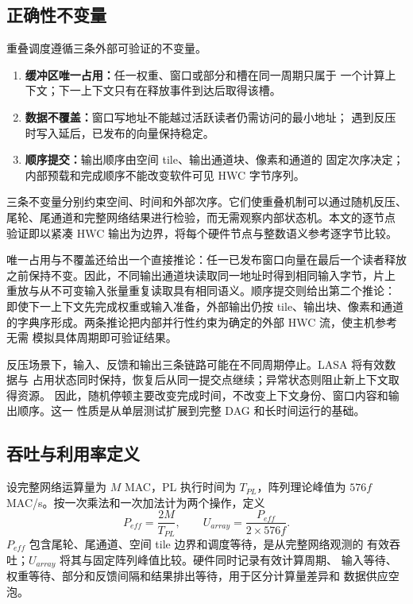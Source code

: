 \subsection{正确性不变量}

重叠调度遵循三条外部可验证的不变量。

\begin{enumerate}[leftmargin=2.1em]
  \item \textbf{缓冲区唯一占用：}任一权重、窗口或部分和槽在同一周期只属于
  一个计算上下文；下一上下文只有在释放事件到达后取得该槽。
  \item \textbf{数据不覆盖：}窗口写地址不能越过活跃读者仍需访问的最小地址；
  遇到反压时写入延后，已发布的向量保持稳定。
  \item \textbf{顺序提交：}输出顺序由空间 tile、输出通道块、像素和通道的
  固定次序决定；内部预载和完成顺序不能改变软件可见 HWC 字节序列。
\end{enumerate}

三条不变量分别约束空间、时间和外部次序。它们使重叠机制可以通过随机反压、
尾轮、尾通道和完整网络结果进行检验，而无需观察内部状态机。本文的逐节点
验证即以紧凑 HWC 输出为边界，将每个硬件节点与整数语义参考逐字节比较。

唯一占用与不覆盖还给出一个直接推论：任一已发布窗口向量在最后一个读者释放
之前保持不变。因此，不同输出通道块读取同一地址时得到相同输入字节，片上
重放与从不可变输入张量重复读取具有相同语义。顺序提交则给出第二个推论：
即使下一上下文先完成权重或输入准备，外部输出仍按 tile、输出块、像素和通道
的字典序形成。两条推论把内部并行性约束为确定的外部 HWC 流，使主机参考无需
模拟具体周期即可验证结果。

反压场景下，输入、反馈和输出三条链路可能在不同周期停止。LASA 将有效数据与
占用状态同时保持，恢复后从同一提交点继续；异常状态则阻止新上下文取得资源。
因此，随机停顿主要改变完成时间，不改变上下文身份、窗口内容和输出顺序。这一
性质是从单层测试扩展到完整 DAG 和长时间运行的基础。

\subsection{吞吐与利用率定义}

设完整网络运算量为 $M$ MAC，PL 执行时间为 $T_{PL}$，阵列理论峰值为
$576f$ MAC/s。按一次乘法和一次加法计为两个操作，定义
\begin{equation}
P_{eff}=\frac{2M}{T_{PL}},\qquad
U_{array}=\frac{P_{eff}}{2\times576f}.
\label{eq:utilization}
\end{equation}
$P_{eff}$ 包含尾轮、尾通道、空间 tile 边界和调度等待，是从完整网络观测的
有效吞吐；$U_{array}$ 将其与固定阵列峰值比较。硬件同时记录有效计算周期、
输入等待、权重等待、部分和反馈间隔和结果排出等待，用于区分计算量差异和
数据供应空泡。
